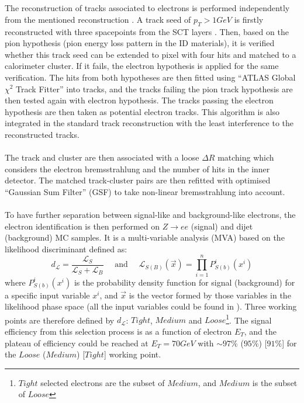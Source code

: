 \\
\\The reconstruction of tracks associated to electrons is performed independently from the mentioned reconstruction . A track seed of $p_{T}>1GeV$ is firstly reconstructed with three spacepoints from the SCT layers . Then, based on the pion hypothesis (pion energy loss pattern in the ID materials), it is verified whether this track seed can be extended to pixel with four hits and matched to a calorimeter cluster. If it fails, the electron hypothesis is applied for the same verification. The hits from both hypotheses are then fitted using ``ATLAS Global $\chi^{2}$ Track Fitter''\cite{Cornelissen:2008zza} into tracks, and the tracks failing the pion track hypothesis are then tested again with electron hypothesis. The tracks passing the electron hypothesis are then taken as potential electron tracks. This algorithm is also integrated in the standard track reconstruction with the least interference to the reconstructed tracks.
\\
\\The track and cluster are then associated with a loose $\Delta R$ matching which considers the electron bremsstrahlung and the number of hits in the inner detector. The matched track-cluster pairs are then refitted with optimised ``Gaussian Sum Filter'' (GSF) \cite{ATLAS-CONF-2012-047} to take non-linear bremsstrahlung into account. 
\\
\\To have further separation between signal-like and background-like electrons, the electron identification is then performed on $Z \rightarrow ee$ (signal) and dijet (background) MC samples. It is a multi-variable analysis (MVA) based on the likelihood discriminant defined as:
\\
\begin{equation}
d_{\mathcal{L}}=\frac{\mathcal{L}_{S}}{\mathcal{L}_{S}+\mathcal{L}_{B}}    
\quad \text{ and } \quad
\mathcal{L}_{S(B)}(\vec{x})=\prod_{i = 1}^{n}P^{i}_{S(b)}(x^{i})
\end{equation}
where $P^{i}_{S(b)}(x^{i})$ is the probability density function for signal (background) for a specific input variable $x^{i}$, and $\vec{x}$ is the vector formed by those variables in the likelihood phase space (all the input variables could be found in \cite{ATL-PHYS-PUB-2015-041}). Three working points are therefore defined by $d_{\mathcal{L}}$: $Tight$, $Medium$ and $Loose$\footnote{$Tight$ selected electrons are the subset of $Medium$, and $Medium$ is the subset of $Loose$}. The signal efficiency from this selection process is as a function of electron $E_{T}$, and the plateau of efficiency could be reached at $E_{T}=70GeV$ with $\sim 97\%$ ($95\%$) [$91\%$] for the $Loose$ ($Medium$) [$Tight$] working point. 
